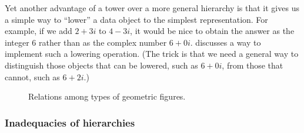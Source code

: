 Yet another advantage of a tower over a more general hierarchy is that it gives
us a simple way to ``lower'' a data object to the simplest representation.  For
example, if we add \( 2 + 3i \) to \( 4 - 3i \), it would be nice to obtain the
answer as the integer 6 rather than as the complex number \( 6 + 0i \).
 discusses a way to implement such a lowering operation.
(The trick is that we need a general way to distinguish those objects that can
be lowered, such as \( 6 + 0i \), from those that cannot, such as \( 6 + 2i \).)

\begin{figure}[tb]
\label{Figure 2.26}
\centering
\begin{comment}
\heading{Figure 2.26:} Relations among types of geometric figures.

\begin{example}
                     polygon
                    /       \
                   /         \
            triangle         quadrilateral
            /     \              /     \
           /       \            /       \
     isosceles   right      trapezoid   kite
     triangle    triangle       |         |
      |     \      |            |         |
      |      \     |            |         |
equilateral   isosceles   parallelogram   |
triangle      right          |       \    |
              triangle       |        \   |
                          rectangle  rhombus
                                \    /
                                 \  /
                                square
\end{example}
\end{comment}

\par\bigskip
\noindent
{} Relations among types of geometric figures.
\end{figure}

\subsubsection*{Inadequacies of hierarchies}

\enlargethispage{\baselineskip}

